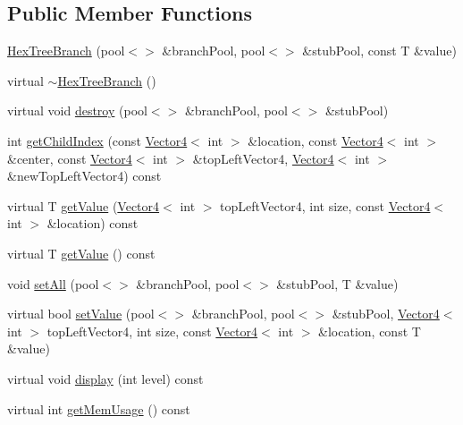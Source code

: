 \subsection*{Public Member Functions}
\begin{CompactItemize}
\item 
\hyperlink{class_j_g_t_l_1_1_hex_tree_branch_d7db0d8efdf004a111fc3e690e4382f5}{Hex\-Tree\-Branch} (pool$<$$>$ \&branch\-Pool, pool$<$$>$ \&stub\-Pool, const T \&value)
\item 
virtual \hyperlink{class_j_g_t_l_1_1_hex_tree_branch_72074225e2a22d7bf9642f47d67d8b05}{$\sim$Hex\-Tree\-Branch} ()
\item 
virtual void \hyperlink{class_j_g_t_l_1_1_hex_tree_branch_d89e805f2da424578087d92b0be7e35e}{destroy} (pool$<$$>$ \&branch\-Pool, pool$<$$>$ \&stub\-Pool)
\item 
int \hyperlink{class_j_g_t_l_1_1_hex_tree_branch_675bb8015ef743e126b2b5a8986195e5}{get\-Child\-Index} (const \hyperlink{class_j_g_t_l_1_1_vector4}{Vector4}$<$ int $>$ \&location, const \hyperlink{class_j_g_t_l_1_1_vector4}{Vector4}$<$ int $>$ \&center, const \hyperlink{class_j_g_t_l_1_1_vector4}{Vector4}$<$ int $>$ \&top\-Left\-Vector4, \hyperlink{class_j_g_t_l_1_1_vector4}{Vector4}$<$ int $>$ \&new\-Top\-Left\-Vector4) const 
\item 
virtual T \hyperlink{class_j_g_t_l_1_1_hex_tree_branch_e5124a6441d3e3d3c21f0d20124a3599}{get\-Value} (\hyperlink{class_j_g_t_l_1_1_vector4}{Vector4}$<$ int $>$ top\-Left\-Vector4, int size, const \hyperlink{class_j_g_t_l_1_1_vector4}{Vector4}$<$ int $>$ \&location) const 
\item 
virtual T \hyperlink{class_j_g_t_l_1_1_hex_tree_branch_25a53141349844dc869458f30db6f2a7}{get\-Value} () const
\item 
void \hyperlink{class_j_g_t_l_1_1_hex_tree_branch_2c1642e6125754f5ed1100d2422a7260}{set\-All} (pool$<$$>$ \&branch\-Pool, pool$<$$>$ \&stub\-Pool, T \&value)
\item 
virtual bool \hyperlink{class_j_g_t_l_1_1_hex_tree_branch_26769f998116310e9c17a03ee53f256c}{set\-Value} (pool$<$$>$ \&branch\-Pool, pool$<$$>$ \&stub\-Pool, \hyperlink{class_j_g_t_l_1_1_vector4}{Vector4}$<$ int $>$ top\-Left\-Vector4, int size, const \hyperlink{class_j_g_t_l_1_1_vector4}{Vector4}$<$ int $>$ \&location, const T \&value)
\item 
virtual void \hyperlink{class_j_g_t_l_1_1_hex_tree_branch_b9ca243a3f04629750ee65544b14e548}{display} (int level) const
\item 
virtual int \hyperlink{class_j_g_t_l_1_1_hex_tree_branch_84bea1c135b12ec017dfa3c701d0f9c9}{get\-Mem\-Usage} () const
\end{CompactItemize}
